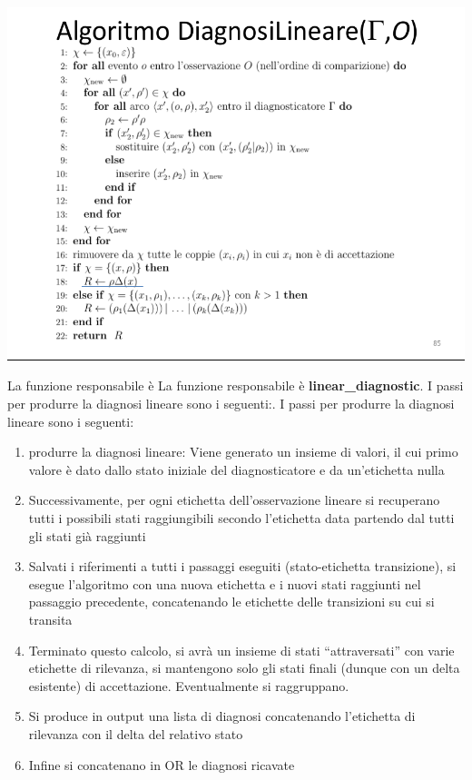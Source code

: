 \includegraphics[width=\textwidth]{immagini/diagnosilineare.png}

La funzione responsabile è La funzione responsabile è \textbf{linear\_diagnostic}. I passi per produrre la diagnosi lineare sono i seguenti:. I passi per produrre la diagnosi lineare sono i seguenti:
\begin{enumerate}
    \item produrre la diagnosi lineare: 
    Viene generato un insieme di valori, il cui primo valore è dato dallo stato iniziale del diagnosticatore e da un’etichetta nulla
    \item Successivamente, per ogni etichetta dell’osservazione lineare si recuperano tutti i possibili stati raggiungibili secondo l’etichetta data partendo dal tutti gli stati già raggiunti
    \item Salvati i riferimenti a tutti i passaggi eseguiti (stato-etichetta transizione), si esegue l’algoritmo con una nuova etichetta e i nuovi stati raggiunti nel passaggio precedente, concatenando le etichette delle transizioni su cui si transita
    \item Terminato questo calcolo, si avrà un insieme di stati “attraversati” con varie etichette di rilevanza, si mantengono solo gli stati finali (dunque con un delta esistente) di accettazione. Eventualmente si raggruppano.
    \item Si produce in output una lista di diagnosi concatenando l’etichetta di rilevanza con il delta del relativo stato
    \item Infine si concatenano in OR le diagnosi ricavate
\end{enumerate}

